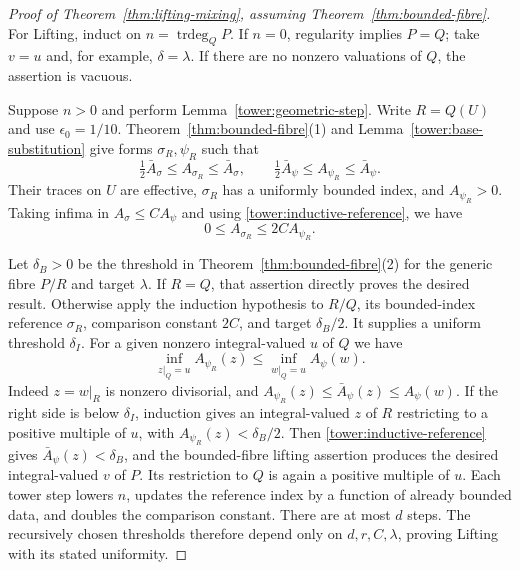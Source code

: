 \begin{proof}[Proof of Theorem~\ref{thm:lifting-mixing}, assuming
Theorem~\ref{thm:bounded-fibre}]
For Lifting, induct on $n=\operatorname{trdeg}_Q P$.
If $n=0$, regularity implies $P=Q$; take $v=u$ and, for example,
$\delta=\lambda$.  If there are no nonzero valuations of $Q$,
the assertion is vacuous.

Suppose $n>0$ and perform Lemma~\ref{tower:geometric-step}.
Write $R=Q(U)$ and use $\epsilon_0=1/10$.
Theorem~\ref{thm:bounded-fibre}(1) and
Lemma~\ref{tower:base-substitution} give forms $\sigma_R,\psi_R$
such that
\begin{equation}
\label{tower:inductive-reference}
 \tfrac12\bar A_\sigma\le A_{\sigma_R}\le\bar A_\sigma,
 \qquad
 \tfrac12\bar A_\psi\le A_{\psi_R}\le\bar A_\psi.
\end{equation}
Their traces on $U$ are effective, $\sigma_R$ has a uniformly
bounded index, and $A_{\psi_R}>0$.
Taking infima in $A_\sigma\le C A_\psi$ and using
\eqref{tower:inductive-reference}, we have
\begin{equation}
\label{tower:inductive-comparison}
 0\le A_{\sigma_R}\le2C A_{\psi_R}.
\end{equation}

Let $\delta_B>0$ be the threshold in
Theorem~\ref{thm:bounded-fibre}(2) for the generic fibre $P/R$
and target $\lambda$.  If $R=Q$, that assertion directly proves
the desired result.  Otherwise apply the induction hypothesis to
$R/Q$, its bounded-index reference $\sigma_R$, comparison
constant $2C$, and target $\delta_B/2$.
It supplies a uniform threshold $\delta_I$.
For a given nonzero integral-valued $u$ of $Q$ we have
\begin{equation}
\label{tower:nested-infimum}
 \inf_{z|_Q=u}A_{\psi_R}(z)
 \le\inf_{w|_Q=u}A_\psi(w).
\end{equation}
Indeed $z=w|_R$ is nonzero divisorial, and
$A_{\psi_R}(z)\le\bar A_\psi(z)\le A_\psi(w)$.
If the right side is below $\delta_I$, induction gives an
integral-valued $z$ of $R$ restricting to a positive multiple of
$u$, with $A_{\psi_R}(z)<\delta_B/2$.
Then \eqref{tower:inductive-reference} gives
$\bar A_\psi(z)<\delta_B$, and the bounded-fibre lifting assertion
produces the desired integral-valued $v$ of $P$.
Its restriction to $Q$ is again a positive multiple of $u$.
Each tower step lowers $n$, updates the reference index by a
function of already bounded data, and doubles the comparison
constant.  There are at most $d$ steps.  The recursively chosen
thresholds therefore depend only on $d,r,C,\lambda$, proving
Lifting with its stated uniformity.


\end{proof}
